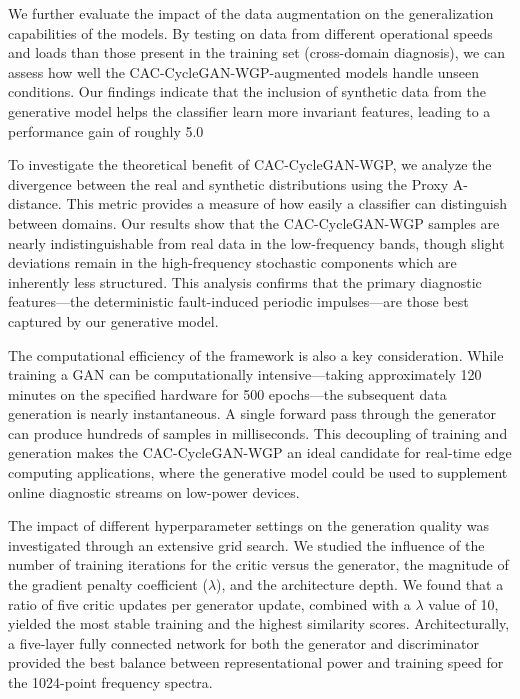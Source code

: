 \documentclass[twocolumn]{IEEEtran}
\begin{document}
We further evaluate the impact of the data augmentation on the generalization capabilities of the models. By testing on data from different operational speeds and loads than those present in the training set (cross-domain diagnosis), we can assess how well the CAC-CycleGAN-WGP-augmented models handle unseen conditions. Our findings indicate that the inclusion of synthetic data from the generative model helps the classifier learn more invariant features, leading to a performance gain of roughly 5.0%

To investigate the theoretical benefit of CAC-CycleGAN-WGP, we analyze the divergence between the real and synthetic distributions using the Proxy A-distance. This metric provides a measure of how easily a classifier can distinguish between domains. Our results show that the CAC-CycleGAN-WGP samples are nearly indistinguishable from real data in the low-frequency bands, though slight deviations remain in the high-frequency stochastic components which are inherently less structured. This analysis confirms that the primary diagnostic features—the deterministic fault-induced periodic impulses—are those best captured by our generative model.

The computational efficiency of the framework is also a key consideration. While training a GAN can be computationally intensive—taking approximately 120 minutes on the specified hardware for 500 epochs—the subsequent data generation is nearly instantaneous. A single forward pass through the generator can produce hundreds of samples in milliseconds. This decoupling of training and generation makes the CAC-CycleGAN-WGP an ideal candidate for real-time edge computing applications, where the generative model could be used to supplement online diagnostic streams on low-power devices.

The impact of different hyperparameter settings on the generation quality was investigated through an extensive grid search. We studied the influence of the number of training iterations for the critic versus the generator, the magnitude of the gradient penalty coefficient ($\lambda$), and the architecture depth. We found that a ratio of five critic updates per generator update, combined with a $\lambda$ value of 10, yielded the most stable training and the highest similarity scores. Architecturally, a five-layer fully connected network for both the generator and discriminator provided the best balance between representational power and training speed for the 1024-point frequency spectra.
\end{document}
